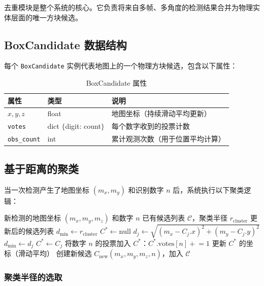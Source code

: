 \documentclass[12pt,a4paper]{article}
\begin{document}
去重模块是整个系统的核心。它负责将来自多帧、多角度的检测结果合并为物理实体层面的唯一方块候选。

\subsection{BoxCandidate 数据结构}

每个 \texttt{BoxCandidate} 实例代表地图上的一个物理方块候选，包含以下属性：

\begin{table}[H]
\centering
\caption{BoxCandidate 属性}
\label{tab:boxcandidate}
\begin{tabular}{@{}lll@{}}
\toprule
\textbf{属性} & \textbf{类型} & \textbf{说明} \\
\midrule
$x, y, z$ & float & 地图坐标（持续滑动平均更新） \\
\texttt{votes} & dict $\{$digit: count$\}$ & 每个数字收到的投票计数 \\
\texttt{obs\_count} & int & 累计观测次数（用于位置平均计算） \\
\bottomrule
\end{tabular}
\end{table}

\subsection{基于距离的聚类}

当一次检测产生了地图坐标 $(m_x, m_y)$ 和识别数字 $n$ 后，系统执行以下聚类逻辑：

\begin{algorithm}[H]
\caption{3D 聚类去重}
\label{alg:clustering}
\begin{algorithmic}[1]
\REQUIRE 新检测的地图坐标 $(m_x, m_y, m_z)$ 和数字 $n$
\REQUIRE 已有候选列表 $\mathcal{C}$，聚类半径 $r_{\text{cluster}}$
\ENSURE 更新后的候选列表
\STATE $d_{\min} \leftarrow r_{\text{cluster}}$
\STATE $C^* \leftarrow \text{null}$
  \STATE $d_j \leftarrow \sqrt{(m_x - C_j.x)^2 + (m_y - C_j.y)^2}$
    \STATE $d_{\min} \leftarrow d_j$
    \STATE $C^* \leftarrow C_j$
  \ENDIF
\ENDFOR
{}
  \STATE 将数字 $n$ 的投票加入 $C^*$：$C^*.\text{votes}[n] \mathrel{+}= 1$
  \STATE 更新 $C^*$ 的坐标（滑动平均）
\ELSE
  \STATE 创建新候选 $C_{\text{new}}(m_x, m_y, m_z, n)$，加入 $\mathcal{C}$
\ENDIF
\end{algorithmic}
\end{algorithm}

\subsubsection{聚类半径的选取}
\end{document}
